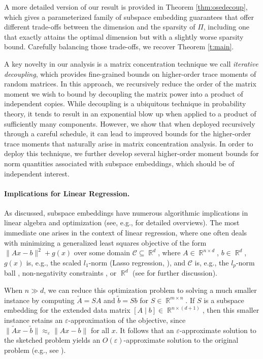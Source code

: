 \documentclass[11pt]{amsart}
\numberwithin{equation}{section}
\numberwithin{equation}{section}
\DeclareMathOperator{\R}{\mathbb{R}}
\begin{document}
A more detailed version of our result is provided in Theorem \ref{thm:osedecoup}, which gives a parameterized family of subspace embedding guarantees that offer different trade-offs between the dimension and the sparsity of $\Pi$, including one that exactly attains the optimal dimension but with a slightly worse sparsity bound. Carefully balancing those trade-offs, we recover Theorem \ref{t:main}.

A key novelty in our analysis is a matrix concentration technique we call \emph{iterative decoupling}, which provides fine-grained bounds on higher-order trace moments of random matrices. In this approach, we recursively reduce the order of the matrix moment we wish to bound by decoupling the matrix power into a product of independent copies. While decoupling is a ubiquitous technique in probability theory, it tends to result in an exponential blow up when applied to a product of sufficiently many components. However, we show that when deployed recursively through a careful schedule, it can lead to improved bounds for the higher-order trace moments that naturally arise in matrix concentration analysis. In order to deploy this technique, we further develop several higher-order moment bounds for norm quantities associated with subspace embeddings, which should be of independent interest.

\paragraph{\textbf{Implications for Linear Regression.}}
As discussed, subspace embeddings have numerous algorithmic implications in linear algebra and optimization (see, e.g., \cite{woodruff2014sketching,martinsson2020randomized,randlapack_book} for detailed overviews). The most immediate one arises in the context of linear regression, where one often deals with minimizing a generalized least squares objective of the form $\|Ax-b\|^2+g(x)$ over some domain $\mathcal C\subseteq\R^d$, where $A\in\R^{n\times d}$, $ b\in\R^d$, $g(x)$ is, e.g., the scaled $l_1$-norm (Lasso regression, \cite{tibshirani1996regression}), and $\mathcal C$ is, e.g., the $l_p$-norm ball \cite{raskutti2011minimax}, non-negativity constraints \cite{boutsidis2009random}, or $\R^d$ (see \cite{pilanci2015randomized} for further discussion).

When $n\gg d$, we can reduce this optimization problem to solving a much smaller instance by computing  $\tilde A=SA$ and  $\tilde b=Sb$ for $S\in\R^{m\times n}$. If $S$ is a subspace embedding for the extended data matrix $[A\mid b]\in\R^{n\times (d+1)}$, then this smaller instance retains an $\varepsilon$-approximation of the objective, since $\|\tilde Ax-\tilde b\|\approx_\varepsilon\|Ax-b\|$ for all $x$. It follows that an $\varepsilon$-approximate solution to the sketched problem yields an $O(\varepsilon)$-approximate solution to the original problem (e.g., see \cite{chenakkod2024optimal}). 
\end{document}

